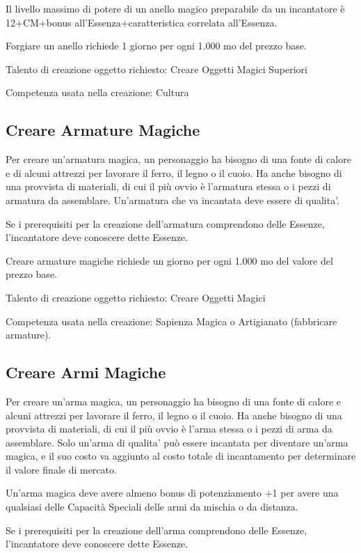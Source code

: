 \documentclass[a4paper,11pt,twoside,openany]{book}
\begin{document}
Il livello massimo di potere di un anello magico preparabile da un incantatore è 12+CM+bonus all'Essenza+caratteristica correlata all'Essenza.

Forgiare un anello richiede 1 giorno per ogni 1.000 mo del prezzo base.

Talento di creazione oggetto richiesto: Creare Oggetti Magici Superiori

Competenza usata nella creazione: Cultura

\subsection{Creare Armature Magiche}

Per creare un'armatura magica, un personaggio ha bisogno di una fonte di calore e di alcuni attrezzi per lavorare il ferro, il legno o il cuoio. Ha anche bisogno di una provvista di materiali, di cui il più ovvio è l'armatura stessa o i pezzi di armatura da assemblare. Un'armatura che va incantata deve essere di qualita'.

Se i prerequisiti per la creazione dell'armatura comprendono delle Essenze, l'incantatore deve conoscere dette Essenze.

Creare armature magiche richiede un giorno per ogni 1.000 mo del valore
del prezzo base.

Talento di creazione oggetto richiesto: Creare Oggetti Magici

Competenza usata nella creazione: Sapienza Magica o Artigianato (fabbricare armature).

\subsection{Creare Armi Magiche}

Per creare un'arma magica, un personaggio ha bisogno di una fonte di calore e alcuni attrezzi per lavorare il ferro, il legno o il cuoio. Ha anche bisogno di una provvista di materiali, di cui il più ovvio è l'arma stessa o i pezzi di arma da assemblare. Solo un'arma di qualita' può essere incantata per diventare un'arma magica, e il suo costo va aggiunto al costo totale di incantamento per determinare il valore finale di mercato.

Un'arma magica deve avere almeno bonus di potenziamento +1 per avere una qualsiasi delle Capacità Speciali delle armi da mischia o da distanza.

Se i prerequisiti per la creazione dell'arma comprendono delle Essenze, l'incantatore deve conoscere dette Essenze.
\end{document}
